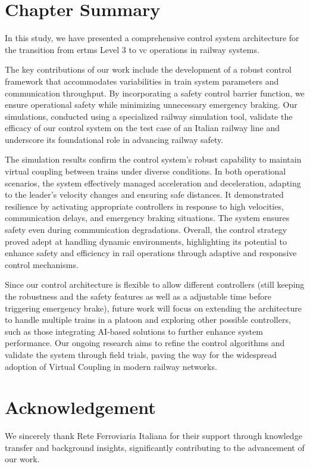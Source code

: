 		
				
		
		

		
		

		
		\clearpage


\section{Chapter Summary}
\label{sec:conclusion}

In this study, we have presented a comprehensive control system architecture for the transition from \gls{ertms} Level 3 to \gls{vc} operations in railway systems. 

The key contributions of our work include the development of a robust control framework that accommodates variabilities in train system parameters and communication throughput. By incorporating a safety control barrier function, we ensure operational safety while minimizing unnecessary emergency braking. Our simulations, conducted using a specialized railway simulation tool, validate the efficacy of our control system on the test case of an Italian railway line and underscore its foundational role in advancing railway safety.

The simulation results confirm the control system's robust capability to maintain virtual coupling between trains under diverse conditions. In both operational scenarios, the system effectively managed acceleration and deceleration, adapting to the leader's velocity changes and ensuring safe distances. It demonstrated resilience by activating appropriate controllers in response to high velocities, communication delays, and emergency braking situations. The system ensures safety even during communication degradations. Overall, the control strategy proved adept at handling dynamic environments, highlighting its potential to enhance safety and efficiency in rail operations through adaptive and responsive control mechanisms.

Since our control architecture is flexible to allow different controllers (still keeping the robustness and the safety features as well as a adjustable time before triggering emergency brake), future work will focus on extending the architecture to handle multiple trains in a platoon and exploring other possible controllers, such as those  integrating AI-based solutions to further enhance system performance. Our ongoing research aims to refine the control algorithms and validate the system through field trials, paving the way for the widespread adoption of Virtual Coupling in modern railway networks.

\section*{Acknowledgement}
We sincerely thank Rete Ferroviaria Italiana for their support through knowledge transfer and background insights, significantly contributing to the advancement of our work.









